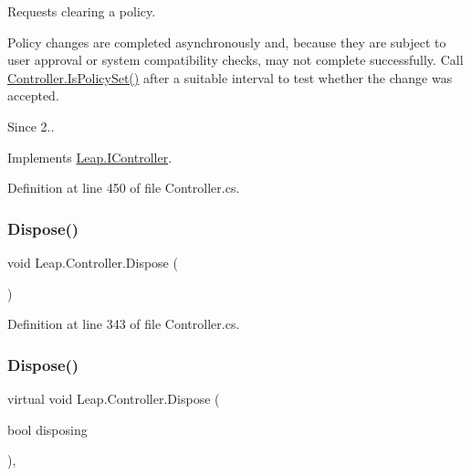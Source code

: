 Requests clearing a policy. 

Policy changes are completed asynchronously and, because they are subject to user approval or system compatibility checks, may not complete successfully. Call \mbox{\hyperlink{class_leap_1_1_controller_af0f85f9c36a57143107952afc26ec5d4}{Controller.\+Is\+Policy\+Set()}} after a suitable interval to test whether the change was accepted. \begin{DoxySince}{Since}
2.. 
\end{DoxySince}


Implements \mbox{\hyperlink{interface_leap_1_1_i_controller_a7aaaef3d250d3b9114a5836d5e470bb3}{Leap.\+I\+Controller}}.



Definition at line 450 of file Controller.\+cs.

\mbox{\label{class_leap_1_1_controller_ad2b8546f002e50164178d1cb7fff4d57}} 
\subsubsection{\texorpdfstring{Dispose()}{Dispose()}\hspace{0.1cm}{\footnotesize\ttfamily [1/2]}}
{\footnotesize\ttfamily void Leap.\+Controller.\+Dispose (\begin{DoxyParamCaption}{ }\end{DoxyParamCaption})}



Definition at line 343 of file Controller.\+cs.

\mbox{\label{class_leap_1_1_controller_a491436d5722a11b55596f2f14434098b}} 
\subsubsection{\texorpdfstring{Dispose()}{Dispose()}\hspace{0.1cm}{\footnotesize\ttfamily [2/2]}}
{\footnotesize\ttfamily virtual void Leap.\+Controller.\+Dispose (\begin{DoxyParamCaption}\item[{bool}]{disposing }\end{DoxyParamCaption})\hspace{0.3cm}{\ttfamily [protected]}, {\ttfamily [virtual]}}



